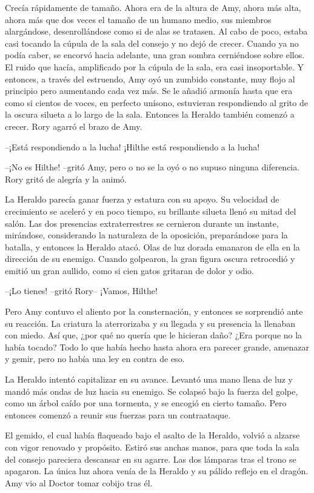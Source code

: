 {Crecía rápidamente de tamaño. Ahora era de la altura de Amy, ahora más
	alta, ahora más que dos veces el tamaño de un humano medio, sus miembros
	alargándose, desenrollándose como si de alas se tratasen. Al cabo de
	poco, estaba casi tocando la cúpula de la sala del consejo y no dejó de
	crecer. Cuando ya no podía caber, se encorvó hacia adelante, una gran
	sombra cerniéndose sobre ellos. El ruido que hacía, amplificado por la
	cúpula de la sala, era casi insoportable. Y entonces, a través del
	estruendo, Amy oyó un zumbido constante, muy flojo al principio pero
	aumentando cada vez más. Se le añadió armonía hasta que era como si
	cientos de voces, en perfecto unísono, estuvieran respondiendo al grito
	de la oscura silueta a lo largo de la sala. Entonces la Heraldo también
comenzó a crecer. Rory agarró el brazo de Amy.}

{--¡Está respondiendo a la lucha! ¡Hilthe está respondiendo a la
lucha!}

{--¡No es Hilthe! --gritó Amy, pero o no se la oyó o no supuso ninguna
diferencia. Rory gritó de alegría y la animó.}

{La Heraldo parecía ganar fuerza y estatura con su apoyo. Su velocidad
	de crecimiento se aceleró y en poco tiempo, su brillante silueta llenó
	su mitad del salón. Las dos presencias extraterrestres se cernieron
	durante un instante, mirándose, considerando la naturaleza de la
	oposición, preparándose para la batalla, y entonces la Heraldo atacó.
	Olas de luz dorada emanaron de ella en la dirección de su enemigo.
	Cuando golpearon, la gran figura oscura retrocedió y emitió un gran
aullido, como si cien gatos gritaran de dolor y odio.}

{--¡Lo tienes! --gritó Rory-- ¡Vamos, Hilthe!}

{Pero Amy contuvo el aliento por la consternación, y entonces se
	sorprendió ante su reacción. La criatura la aterrorizaba y su llegada y
	su presencia la llenaban con miedo. Así que, ¿por qué no quería que le
	hicieran daño? ¿Era porque no la había tocado? Todo lo que había hecho
	hasta ahora era parecer grande, amenazar y gemir, pero no había una ley
en contra de eso.}

{La Heraldo intentó capitalizar en su avance. Levantó una mano llena de
	luz y mandó más ondas de luz hacia su enemigo. Se colapsó bajo la fuerza
	del golpe, como un árbol caído por una tormenta, y se encogió en cierto
	tamaño. Pero entonces comenzó a reunir sus fuerzas para un
contraataque.}

{El gemido, el cual había flaqueado bajo el asalto de la Heraldo, volvió
	a alzarse con vigor renovado y propósito. Estiró sus anchas manos, para
	que toda la sala del consejo pareciera descansar en su agarre. Las dos
	lámparas tras el trono se apagaron. La única luz ahora venía de la
	Heraldo y su pálido reflejo en el dragón. Amy vio al Doctor tomar cobijo
tras él.}

